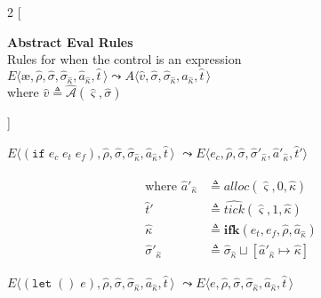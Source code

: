 \documentclass[12pt,draft]{article}
\newcommand\mae{\ensuremath{\text{\ae}}}
\newcommand{\ifsyn}[3]{(\texttt{if}\;#1\;#2\;#3)}
\begin{document}
\newpage
\footnotesize{
\begin{multicols*}{2}
[
\begin{center}
\textbf{Abstract Eval Rules} \\
Rules for when the control is an expression \\
\vspace{10mm}
  $E\langle \mae , \hat{\rho} , \hat{\sigma} , \hat{\sigma}_{\hat{\kappa}} , \hat{a}_{\hat{\kappa}} , \hat{t}\,\rangle
  \leadsto
  A\langle \hat{v} , \hat{\sigma} , \hat{\sigma}_{\hat{\kappa}} , \hat{a}_{\hat{\kappa}} , \hat{t}\,\rangle$ \\
where $\hat{v} \triangleq \hat{\mathcal{A}}(\hat{\varsigma}, \hat{\sigma})$ \\
\end{center}
]
\begin{center}
  $E\langle \ifsyn{e_c}{e_t}{e_f} , \hat{\rho} , \hat{\sigma} , \hat{\sigma}_{\hat{\kappa}} , \hat{a}_{\hat{\kappa}} , \hat{t}\,\rangle$
  $\leadsto E\langle e_c , \hat{\rho} , \hat{\sigma} , \hat{\sigma}'_{\hat{\kappa}} , \hat{a}'_{\hat{\kappa}} , \hat{t}'\rangle$
\end{center}
\vspace{-3mm}
\begin{align*}
  \text{where } \hat{a}'_{\hat{\kappa}} &\triangleq \widehat{alloc}(\hat{\varsigma}, 0, \hat{\kappa}) \\
  \hat{t}' &\triangleq \widehat{tick}(\hat{\varsigma}, 1, \hat{\kappa}) \\
  \hat{\kappa} &\triangleq \textbf{ifk}(e_t, e_f, \hat{\rho}, \hat{a}_{\hat{\kappa}}) \\
  \hat{\sigma}'_{\hat{\kappa}} &\triangleq \hat{\sigma}_{\hat{\kappa}} \sqcup [\hat{a}'_{\hat{\kappa}} \mapsto \hat{\kappa}]
\end{align*}
\begin{center}
  $E\langle (\texttt{let}\;()\;e) , \hat{\rho} , \hat{\sigma} , \hat{\sigma}_{\hat{\kappa}} , \hat{a}_{\hat{\kappa}} , \hat{t}\,\rangle$
  $\leadsto E\langle e , \hat{\rho} , \hat{\sigma} , \hat{\sigma}_{\hat{\kappa}} , \hat{a}_{\hat{\kappa}} , \hat{t}\,\rangle$

\end{center}
\end{multicols*}}
\end{document}
